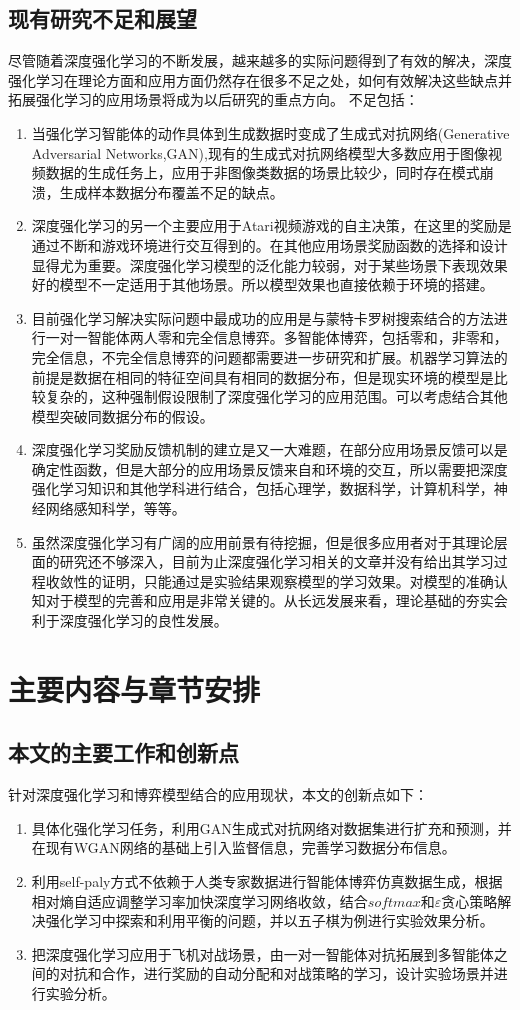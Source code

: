 \subsection{现有研究不足和展望}
尽管随着深度强化学习的不断发展，越来越多的实际问题得到了有效的解决，深度强化学习在理论方面和应用方面仍然存在很多不足之处，如何有效解决这些缺点并拓展强化学习的应用场景将成为以后研究的重点方向。
不足包括：
\begin{enumerate}
	\item 当强化学习智能体的动作具体到生成数据时变成了生成式对抗网络(Generative Adversarial Networks,GAN),现有的生成式对抗网络模型大多数应用于图像视频数据的生成任务上，应用于非图像类数据的场景比较少，同时存在模式崩溃，生成样本数据分布覆盖不足的缺点。
	\item 深度强化学习的另一个主要应用于Atari视频游戏的自主决策，在这里的奖励是通过不断和游戏环境进行交互得到的。在其他应用场景奖励函数的选择和设计显得尤为重要。深度强化学习模型的泛化能力较弱，对于某些场景下表现效果好的模型不一定适用于其他场景。所以模型效果也直接依赖于环境的搭建。
	\item 目前强化学习解决实际问题中最成功的应用是与蒙特卡罗树搜索结合的方法进行一对一智能体两人零和完全信息博弈。多智能体博弈，包括零和，非零和，完全信息，不完全信息博弈的问题都需要进一步研究和扩展。机器学习算法的前提是数据在相同的特征空间具有相同的数据分布，但是现实环境的模型是比较复杂的，这种强制假设限制了深度强化学习的应用范围。可以考虑结合其他模型突破同数据分布的假设。
	\item 深度强化学习奖励反馈机制的建立是又一大难题，在部分应用场景反馈可以是确定性函数，但是大部分的应用场景反馈来自和环境的交互，所以需要把深度强化学习知识和其他学科进行结合，包括心理学，数据科学，计算机科学，神经网络感知科学，等等。
	\item 虽然深度强化学习有广阔的应用前景有待挖掘，但是很多应用者对于其理论层面的研究还不够深入，目前为止深度强化学习相关的文章并没有给出其学习过程收敛性的证明，只能通过是实验结果观察模型的学习效果。对模型的准确认知对于模型的完善和应用是非常关键的。从长远发展来看，理论基础的夯实会利于深度强化学习的良性发展。
\end{enumerate}
\section{主要内容与章节安排}
\subsection{本文的主要工作和创新点}
针对深度强化学习和博弈模型结合的应用现状，本文的创新点如下：
\begin{enumerate}
	\item 具体化强化学习任务，利用GAN生成式对抗网络对数据集进行扩充和预测，并在现有WGAN网络的基础上引入监督信息，完善学习数据分布信息。
	\item 利用self-paly方式不依赖于人类专家数据进行智能体博弈仿真数据生成，根据相对熵自适应调整学习率加快深度学习网络收敛，结合$softmax$和$\varepsilon$贪心策略解决强化学习中探索和利用平衡的问题，并以五子棋为例进行实验效果分析。
	\item 把深度强化学习应用于飞机对战场景，由一对一智能体对抗拓展到多智能体之间的对抗和合作，进行奖励的自动分配和对战策略的学习，设计实验场景并进行实验分析。
\end{enumerate}
